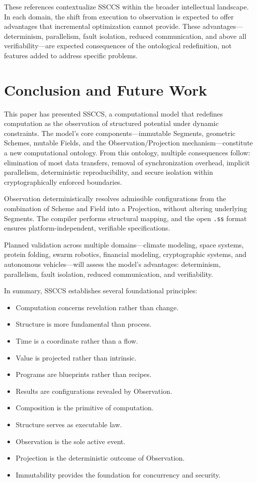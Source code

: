 \documentclass[
  a4paper,
  DIV=11,
  numbers=noendperiod]{scrartcl}
\providecommand{\tightlist}{%
  \setlength{\itemsep}{0pt}\setlength{\parskip}{0pt}}
\begin{document}
These references contextualize SSCCS within the broader intellectual
landscape. In each domain, the shift from execution to observation is
expected to offer advantages that incremental optimization cannot
provide. These advantages---determinism, parallelism, fault isolation,
reduced communication, and above all verifiability---are expected
consequences of the ontological redefinition, not features added to
address specific problems.

\section{Conclusion and Future Work}\label{conclusion-and-future-work}

This paper has presented SSCCS, a computational model that redefines
computation as the observation of structured potential under dynamic
constraints. The model's core components---immutable Segments, geometric
Schemes, mutable Fields, and the Observation/Projection
mechanism---constitute a new computational ontology. From this ontology,
multiple consequences follow: elimination of most data transfers,
removal of synchronization overhead, implicit parallelism, deterministic
reproducibility, and secure isolation within cryptographically enforced
boundaries.

Observation deterministically resolves admissible configurations from
the combination of Scheme and Field into a Projection, without altering
underlying Segments. The compiler performs structural mapping, and the
open \texttt{.ss} format ensures platform-independent, verifiable
specifications.

Planned validation across multiple domains---climate modeling, space
systems, protein folding, swarm robotics, financial modeling,
cryptographic systems, and autonomous vehicles---will assess the model's
advantages: determinism, parallelism, fault isolation, reduced
communication, and verifiability.

In summary, SSCCS establishes several foundational principles:

\begin{itemize}
\tightlist
\item
  Computation concerns revelation rather than change.
\item
  Structure is more fundamental than process.
\item
  Time is a coordinate rather than a flow.
\item
  Value is projected rather than intrinsic.
\item
  Programs are blueprints rather than recipes.
\item
  Results are configurations revealed by Observation.
\item
  Composition is the primitive of computation.
\item
  Structure serves as executable law.
\item
  Observation is the sole active event.
\item
  Projection is the deterministic outcome of Observation.
\item
  Immutability provides the foundation for concurrency and security.
\end{itemize}
\end{document}
